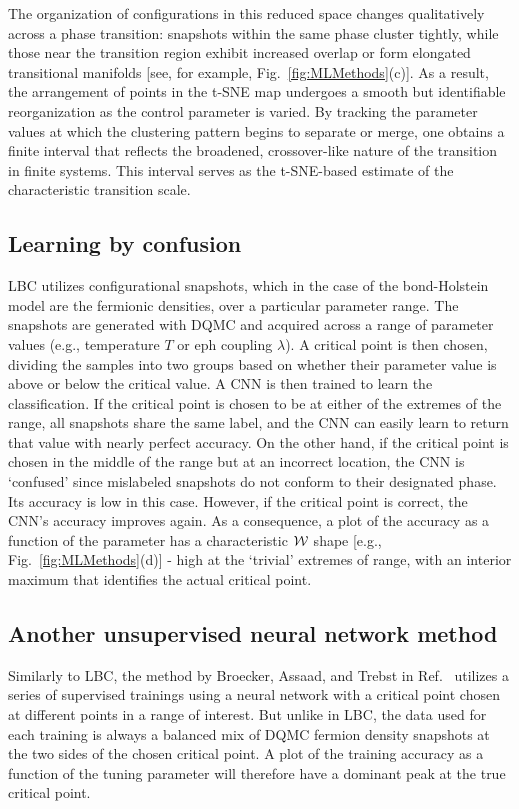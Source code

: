 \documentclass[%
reprint,
superscriptaddress,
nofootinbib,
twocolumn,
amsmath,amssymb,
aps,
prb,
]{revtex4-2}
\begin{document}
The organization of configurations in this reduced space changes qualitatively across a phase transition: snapshots within the same phase cluster tightly, while those near the transition region exhibit increased overlap or form elongated transitional manifolds [see, for example, Fig.~\ref{fig:MLMethods}(c)]. As a result, the arrangement of points in the \gls*{t-SNE} map undergoes a smooth but identifiable reorganization as the control parameter is varied. By tracking the parameter values at which the clustering pattern begins to separate or merge, one obtains a finite interval that reflects the broadened, crossover-like nature of the transition in finite systems. This interval serves as the \gls*{t-SNE}-based estimate of the characteristic transition scale.

\subsection{Learning by confusion}
\gls*{LBC} utilizes configurational snapshots, which in the case of the bond-Holstein model are the fermionic densities, over a particular parameter range. The snapshots are generated with \gls*{DQMC} and acquired across a range of parameter values (e.g., temperature $T$ or \gls*{eph} coupling $\lambda$). A critical point is then chosen, dividing the samples into two groups based on whether their parameter value is above or below the critical value. A \gls*{CNN} is then trained to learn the classification. If the critical point is chosen to be at either of the extremes of the range, all snapshots share the same label, and the \gls*{CNN} can easily learn to return that value with nearly perfect accuracy. On the other hand, if the critical point is chosen in the middle of the range but at an incorrect location, the \gls*{CNN} is `confused' since mislabeled snapshots do not conform to their designated phase. Its accuracy is low in this case. However, if the critical point is correct, the \gls*{CNN}'s accuracy improves again. As a consequence, a plot of the accuracy as a function of the parameter has a characteristic ${\cal W}$ shape [e.g., Fig.~\ref{fig:MLMethods}(d)] - high at the `trivial' extremes of range, with an interior maximum that identifies the actual critical point.

\subsection{Another unsupervised neural network method}
Similarly to \gls*{LBC}, the method by Broecker, Assaad, and Trebst in Ref.~\cite{broecker2017quantum} utilizes a series of supervised trainings using a neural network with a critical point chosen at different points in a range of interest. But unlike in \gls*{LBC}, the data used for each training is always a balanced mix of \gls*{DQMC} fermion density snapshots at the two sides of the chosen critical point. A plot of the training accuracy as a function of the tuning parameter will therefore have a dominant peak at the true critical point.
\end{document}
